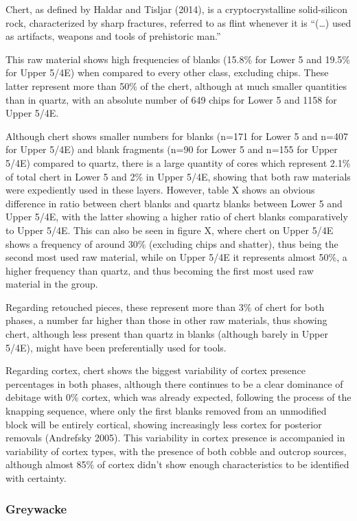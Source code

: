\documentclass[12pt,twoside]{reedthesis}
\begin{document}
Chert, as defined by Haldar and Tisljar (2014), is a cryptocrystalline solid-silicon rock, characterized by sharp fractures, referred to as flint whenever it is ``(\ldots) used as artifacts, weapons and tools of prehistoric man.''

This raw material shows high frequencies of blanks (15.8\% for Lower 5 and 19.5\% for Upper 5/4E) when compared to every other class, excluding chips. These latter represent more than 50\% of the chert, although at much smaller quantities than in quartz, with an absolute number of 649 chips for Lower 5 and 1158 for Upper 5/4E.

Although chert shows smaller numbers for blanks (n=171 for Lower 5 and n=407 for Upper 5/4E) and blank fragments (n=90 for Lower 5 and n=155 for Upper 5/4E) compared to quartz, there is a large quantity of cores which represent 2.1\% of total chert in Lower 5 and 2\% in Upper 5/4E, showing that both raw materials were expediently used in these layers. However, table X shows an obvious difference in ratio between chert blanks and quartz blanks between Lower 5 and Upper 5/4E, with the latter showing a higher ratio of chert blanks comparatively to Upper 5/4E. This can also be seen in figure X, where chert on Upper 5/4E shows a frequency of around 30\% (excluding chips and shatter), thus being the second most used raw material, while on Upper 5/4E it represents almost 50\%, a higher frequency than quartz, and thus becoming the first most used raw material in the group.

Regarding retouched pieces, these represent more than 3\% of chert for both phases, a number far higher than those in other raw materials, thus showing chert, although less present than quartz in blanks (although barely in Upper 5/4E), might have been preferentially used for tools.

Regarding cortex, chert shows the biggest variability of cortex presence percentages in both phases, although there continues to be a clear dominance of debitage with 0\% cortex, which was already expected, following the process of the knapping sequence, where only the first blanks removed from an unmodified block will be entirely cortical, showing increasingly less cortex for posterior removals (Andrefsky 2005). This variability in cortex presence is accompanied in variability of cortex types, with the presence of both cobble and outcrop sources, although almost 85\% of cortex didn't show enough characteristics to be identified with certainty.

\hypertarget{greywacke}{%
\subsubsection{Greywacke}\label{greywacke}}
\end{document}

